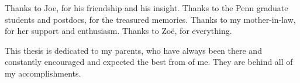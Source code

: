Thanks to Joe, for his friendship and his insight.
Thanks to the Penn graduate students and postdocs, for the treasured memories.
Thanks to my mother-in-law, for her support and enthusiasm.
Thanks to Zo{\"e}, for everything. 

This thesis is dedicated to my parents, who have always been there and constantly 
encouraged and expected the best from of me. They are behind all of my accomplishments.  
